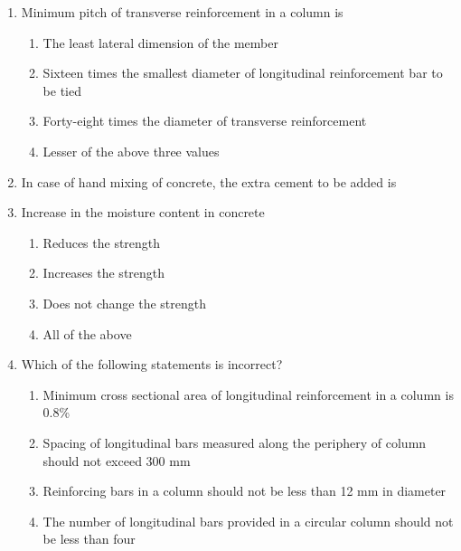 \documentclass[11pt,a4paper]{article}
\begin{document}
\begin{enumerate}
\\
\item{Minimum pitch of transverse reinforcement in a column is}
\begin{enumerate}[label=\Alph*.]
\item{The least lateral dimension of the member}
\item{Sixteen times the smallest diameter of longitudinal reinforcement bar to be tied}
\item{Forty-eight times the diameter of transverse reinforcement}
\item{Lesser of the above three values}
\end{enumerate}
\item{In case of hand mixing of concrete, the extra cement to be added is}
\\
\item{Increase in the moisture content in concrete}
\begin{enumerate}[label=\Alph*.]
\item{Reduces the strength}
\item{Increases the strength}
\item{Does not change the strength}
\item{All of the above}
\end{enumerate}
\item{Which of the following statements is incorrect?}
\begin{enumerate}[label=\Alph*.]
\item{Minimum cross sectional area of longitudinal reinforcement in a column is 0.8\%}
\item{Spacing of longitudinal bars measured along the periphery of column should not exceed 300 mm}
\item{Reinforcing bars in a column should not be less than 12 mm in diameter}
\item{The number of longitudinal bars provided in a circular column should not be less than four}

\end{enumerate}
\end{enumerate}
\end{document}
